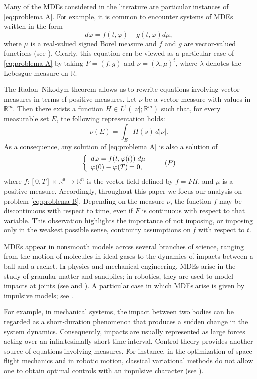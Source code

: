 \documentclass[a4paper,11pt]{amsart}
\theoremstyle{plain}
\theoremstyle{remark}
\newcommand{\rr}{\mathbb{R}}
\numberwithin{equation}{section}
\begin{document}
Many of the MDEs considered in the literature are particular instances of \eqref{eq:problema A}. For example, it is common to encounter systems of MDEs written in the form
\[
d\varphi =f(t,\varphi)+g(t,\varphi)d\mu,
\]
 where $\mu$ is a real-valued signed Borel measure and $f$ and $g$ are vector-valued functions (see \cite{Brogliato}). Clearly, this equation can be viewed as a particular case of \eqref{eq:problema A} by taking $F=(f,g)$ and $\nu=(\lambda,\mu)^t$, where $\lambda$ denotes the Lebesgue measure on $\mathbb{R}$.
 

The Radon--Nikodym theorem allows us to rewrite equations involving vector measures in terms of positive measures. Let $\nu$ be a vector measure with values in $\mathbb{R}^{m}$. Then there exists a function $H \in L^{1}(|\nu|;\mathbb{R}^{m})$ such that, for every measurable set $E$, the following representation holds:
\[
\nu(E) = \int_{E} H(s) \, d|\nu|.
\]
As a consequence, any solution of \eqref{eq:problema A} is also a solution of
	\begin{equation} \label{eq:problema B}
	\left\lbrace \begin{array}{l}
		d\varphi=f(t,\varphi(t))\;d \mu\\
		\varphi(0)-\varphi(T)=0,
	\end{array}\right. \tag{${P}$}
\end{equation}
where $f:[0,T]\times\rr^n\to\rr^{n}$ is the vector field defined by $f=FH$, and $\mu$ is a positive measure. Accordingly, throughout this paper we focus our analysis on problem \eqref{eq:problema B}. Depending on the measure $\nu$, the function $f$ may be discontinuous with respect to time, even if $F$ is continuous with respect to that variable. This observation highlights the importance of not imposing, or imposing only in the weakest possible sense, continuity assumptions on $f$ with respect to $t$.
 
MDEs appear in nonsmooth models across several branches of science, ranging from the motion of molecules in ideal gases to the dynamics of impacts between a ball and a racket. In physics and mechanical engineering, MDEs arise in the study of granular matter and sandpiles; in robotics, they are used to model impacts at joints (see \cite{Brogliato} and \cite{ALeonov}). A particular case in which MDEs arise is given by impulsive models; see \cite{Bainov,Bainov_2,Lakshmikan}.

For example, in mechanical systems, the impact between two bodies can be regarded as a short-duration phenomenon that produces a sudden change in the system dynamics. Consequently, impacts are usually represented as large forces acting over an infinitesimally short time interval. Control theory provides another source of equations involving measures. For instance, in the optimization of space flight mechanics and in robotic motion, classical variational methods do not allow one to obtain optimal controls with an impulsive character (see \cite{S.T.Zavalishchin}).
\end{document}
